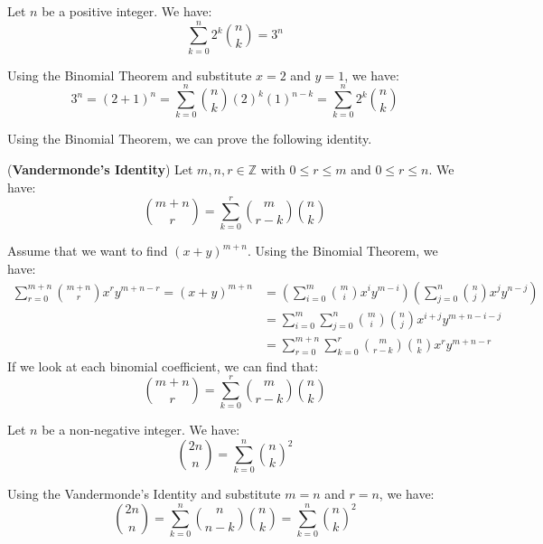 \documentclass{huhtakm-template-book}
\begin{document}
\begin{cor}
	Let $n$ be a positive integer. We have:
	\begin{equation*}
		\sum_{k=0}^{n}2^{k}\binom{n}{k}=3^{n}
	\end{equation*}
\end{cor}
\begin{proofing}
	Using the Binomial Theorem and substitute $x=2$ and $y=1$, we have:
	\begin{equation*}
		3^{n}=(2+1)^{n}=\sum_{k=0}^{n}\binom{n}{k}(2)^{k}(1)^{n-k}=\sum_{k=0}^{n}2^{k}\binom{n}{k}
	\end{equation*}
\end{proofing}
\newpage

Using the Binomial Theorem, we can prove the following identity.
\begin{thm}(\textbf{Vandermonde's Identity})
	Let $m,n,r\in\mathbb{Z}$ with $0\leq r\leq m$ and $0\leq r\leq n$. We have:
	\begin{equation*}
		\binom{m+n}{r}=\sum_{k=0}^{r}\binom{m}{r-k}\binom{n}{k}
	\end{equation*}
\end{thm}
\begin{proofing}
	Assume that we want to find $(x+y)^{m+n}$. Using the Binomial Theorem, we have:
	\begin{align*}
		\sum_{r=0}^{m+n}\binom{m+n}{r}x^{r}y^{m+n-r}=(x+y)^{m+n}&=\left(\sum_{i=0}^{m}\binom{m}{i}x^{i}y^{m-i}\right)\left(\sum_{j=0}^{n}\binom{n}{j}x^{j}y^{n-j}\right)\\
		&=\sum_{i=0}^{m}\sum_{j=0}^{n}\binom{m}{i}\binom{n}{j}x^{i+j}y^{m+n-i-j}\\
		\tag{Setting $r=i+j$ and $k=j$}
		&=\sum_{r=0}^{m+n}\sum_{k=0}^{r}\binom{m}{r-k}\binom{n}{k}x^{r}y^{m+n-r}
	\end{align*}
	If we look at each binomial coefficient, we can find that:
	\begin{equation*}
		\binom{m+n}{r}=\sum_{k=0}^{r}\binom{m}{r-k}\binom{n}{k}
	\end{equation*}
\end{proofing}
\begin{cor}
	Let $n$ be a non-negative integer. We have:
	\begin{equation*}
		\binom{2n}{n}=\sum_{k=0}^{n}\binom{n}{k}^{2}
	\end{equation*}
\end{cor}
\begin{proofing}
	Using the Vandermonde's Identity and substitute $m=n$ and $r=n$, we have:
	\begin{equation*}
		\binom{2n}{n}=\sum_{k=0}^{n}\binom{n}{n-k}\binom{n}{k}=\sum_{k=0}^{n}\binom{n}{k}^{2}
	\end{equation*}
\end{proofing}
\end{document}
